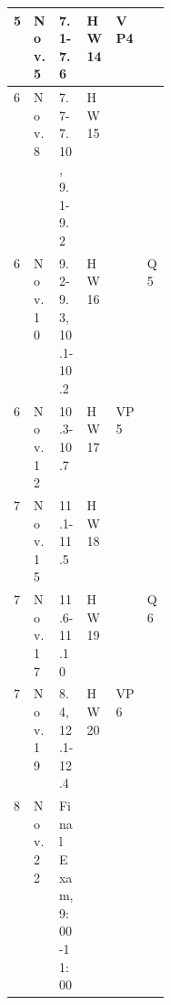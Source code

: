 \documentclass[12pt]{article}
\begin{document}
{\begin{table}[]
\begin{tabular}{l|l|l|l|p{0.2\linewidth}|l}
5             & Nov. 5        &  7.1-7.6   & HW 14           & VP4                     &                   \\ \hline
6             & Nov. 8        &  7.7-7.10, 9.1-9.2  & HW 15           &                     &                  \\ 
6             & Nov. 10        &  9.2-9.3, 10.1-10.2   & HW 16           &                   & Q5                \\ 
6             & Nov. 12        &  10.3-10.7   & HW 17           & VP5                     &                   \\ \hline
7             & Nov. 15        &  11.1-11.5   & HW 18           &                     &                  \\ 
7             & Nov. 17        &  11.6-11.10  & HW 19           &                   & Q6                \\ 
7             & Nov. 19        &  8.4, 12.1-12.4      & HW 20           & VP6                     &                   \\ \hline \hline
8             & Nov. 22        & Final Exam, 9:00-11:00     &                 &                      &                   \\ \hline
\end{tabular}
\end{table}

\newpage

}
\end{document}
